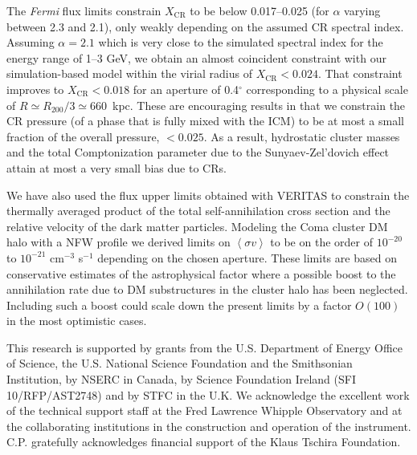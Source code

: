 \documentclass[12pt,manuscript]{aastex}
\def\Fermi{{\em Fermi}\xspace}
\newcommand{\expval}[1]{\left\langle #1 \right\rangle}
\newcommand{\CR}{\mathrm{CR}}
\begin{document}
The \Fermi flux limits constrain $X_\CR$ to be below 0.017--0.025 (for $\alpha$ varying
between 2.3 and 2.1), only weakly depending on the assumed CR spectral index. Assuming $\alpha=2.1$
which is very close to the simulated spectral index for the energy range of 1--3 GeV, we obtain an
almost coincident constraint with our simulation-based model within the virial radius of
$X_\CR<0.024$. That constraint improves to $X_{\CR}<0.018$ for an aperture of 0.4$^\circ$
corresponding to a physical scale of $R \simeq R_{200}/3 \simeq 660$~kpc. These are encouraging
results in that we constrain the CR pressure (of a phase that is fully mixed with the ICM) to be at
most a small fraction of the overall pressure, $<0.025$. As a result, hydrostatic cluster masses
and the total Comptonization parameter due to the Sunyaev-Zel'dovich effect attain at most a very
small bias due to CRs.

We have also used the flux upper limits obtained with VERITAS to constrain the thermally averaged
product of the total self-annihilation cross section and the relative velocity of the dark matter
particles. Modeling the Coma cluster DM halo with a NFW profile we derived limits on
$\expval{\sigma v}$ to be on the order of $10^{-20}$ to $10^{-21}$ cm$^{-3}$ s$^{-1}$ depending on
the chosen aperture. These limits are based on conservative estimates of the astrophysical factor
where a possible boost to the annihilation rate due to DM substructures in the cluster halo has
been neglected. Including such a boost could scale down the present limits by a factor $O(100)$ in
the most optimistic cases.

\acknowledgments
This research is supported by grants from the U.S. Department of Energy Office of Science, the U.S.
National Science Foundation and the Smithsonian Institution, by NSERC in Canada, by Science
Foundation Ireland (SFI 10/RFP/AST2748) and by STFC in the U.K. We acknowledge the excellent work
of the technical support staff at the Fred Lawrence Whipple Observatory and at the collaborating
institutions in the construction and operation of the instrument. C.P. gratefully acknowledges 
financial support of the Klaus Tschira Foundation.




\end{document}
